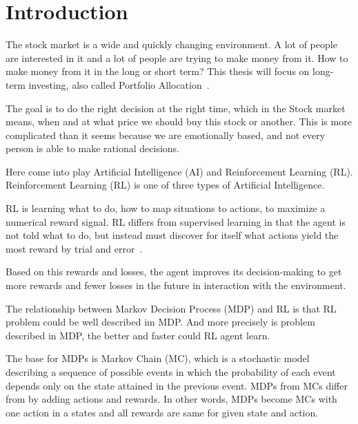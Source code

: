 \chapter{Introduction}\label{ch:introduction}


The stock market is a wide and quickly changing environment.
A lot of people are interested in it and a lot of people are trying to make money from it.
How to make money from it in the long or short term?
This thesis will focus on long-term investing, also called Portfolio Allocation~\cite[p.~67--69]{rao-2022}.

The goal is to do the right decision at the right time, which in the Stock market means, when and at what price we should buy this stock or another.
This is more complicated than it seems because we are emotionally
based, and not every person is able to make rational decisions.

Here come into play Artificial Intelligence (AI) and Reinforcement Learning (RL).
Reinforcement Learning (RL) is one of three types of Artificial Intelligence.

RL is learning what to do, how to map situations to actions, to maximize a numerical reward signal.
RL differs from supervised learning in that the agent is not told what to do,
but instead must discover for itself what actions yield the most
reward by trial and error~\cite[p.~1]{sutton-2018}.

Based on this rewards and losses, the agent improves its decision-making
to get more rewards and fewer losses in the future
in interaction with the environment.

The relationship between Markov Decision Process (MDP) and RL is
that RL problem could be well described im MDP\@.
And more precisely is problem described in MDP,
the better and faster could RL agent learn.

The base for MDPs is Markov Chain (MC),
which is a stochastic model describing a sequence of possible events in which the probability
of each event depends only on the state attained in the previous event.
MDPs from MCs differ from by adding actions and rewards.
In other words, MDPs become MCs with one action in a states and all rewards are same
for given state and action.


